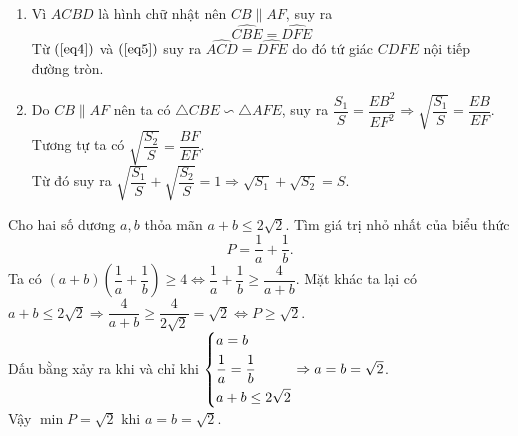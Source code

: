 \begin{ex}
{\begin{enumerate}
\begin{equation}
\end{equation}
Lại có $\widehat{CBE} = \dfrac{1}{2}$ sđ $\wideparen{ BC}$ (góc tạo bởi tiếp tuyến và dây cung) và 
$\widehat{ACD}= \dfrac{1}{2}$ sđ $\wideparen{AD}$ (góc nội tiếp)\\
Mà $BC = AD$ (do $BC$ và $AD$ là hai cạnh của hình chữ nhật). Suy ra
\begin{equation}\label{eq4}
\widehat{CBE} = \widehat{ACD}
\end{equation}
Từ $(\ref{eq3})$ và $(\ref{eq4})$ suy ra $\triangle{ACD}\backsim \triangle{CBE}$.
\item Vì $ACBD$ là hình chữ nhật nên $CB \parallel AF$, suy ra
\begin{equation}\label{eq5}
\widehat{CBE} = \widehat{DFE}
\end{equation}
Từ $(\ref{eq4})$ và $(\ref{eq5})$ suy ra $\widehat{ACD} = \widehat{DFE}$ do đó tứ giác $CDFE$ nội tiếp đường tròn.
\item Do $CB \parallel AF$ nên ta có $\triangle{CBE}\backsim \triangle{AFE}$, suy ra $\dfrac{S_1}{S} = \dfrac{EB^2}{EF^2} \Rightarrow  \sqrt{\dfrac{S_1}{S}} = \dfrac{EB}{EF}$. \\
Tương tự ta có $\sqrt{\dfrac{S_2}{S}} = \dfrac{BF}{EF}$.\\
Từ đó suy ra $\sqrt{\dfrac{S_1}{S}} + \sqrt{\dfrac{S_2}{S}} = 1 \Rightarrow \sqrt{S_1} + \sqrt{S_2} = S$.
\end{enumerate}
}
\end{ex}

\begin{ex}%
Cho hai số dương $a, b$ thỏa mãn $a + b \le 2\sqrt{2}$. Tìm giá trị nhỏ nhất của biểu thức 
\begin{equation*}
P = \dfrac{1}{a}+ \dfrac{1}{b}.
\end{equation*}
\loigiai
{
Ta có $(a+b)\left(\dfrac{1}{a}+\dfrac{1}{b}\right)\ge 4\Leftrightarrow\dfrac{1}{a}+ \dfrac{1}{b} \ge \dfrac{4}{a +b } $. Mặt khác ta lại có $a+ b \le 2\sqrt{2} \Rightarrow \dfrac{4}{a+ b} \ge \dfrac{4}{2\sqrt{2}} = \sqrt{2} \Leftrightarrow P \ge \sqrt{2}$.\\
Dấu bằng xảy ra khi và chỉ khi $\left\{\begin{aligned}&a=b\\&\dfrac{1}{a} = \dfrac{1}{b}\\& a+ b \le 2\sqrt{2}\end{aligned}\right. \Rightarrow a = b = \sqrt{2}$.\\
Vậy $\min P= \sqrt{2}$ khi $a = b = \sqrt{2}$.
}
\end{ex}
